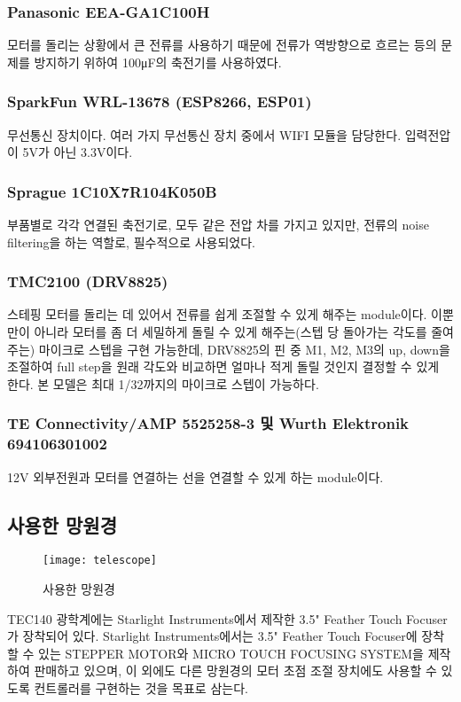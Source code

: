 \subsubsection{Panasonic EEA-GA1C100H}

모터를 돌리는 상황에서 큰 전류를 사용하기 때문에 전류가 역방향으로 흐르는 등의 문제를 방지하기 위하여 100μF의 축전기를 사용하였다.

\subsubsection{SparkFun WRL-13678 (ESP8266, ESP01)}

무선통신 장치이다. 여러 가지 무선통신 장치 중에서 WIFI 모듈을 담당한다. 입력전압이 5V가 아닌 3.3V이다.

\subsubsection{Sprague 1C10X7R104K050B}

부품별로 각각 연결된 축전기로, 모두 같은 전압 차를 가지고 있지만, 전류의 noise filtering을 하는 역할로, 필수적으로 사용되었다.

\subsubsection{TMC2100 (DRV8825)}

스테핑 모터를 돌리는 데 있어서 전류를 쉽게 조절할 수 있게 해주는 module이다. 이뿐만이 아니라 모터를 좀 더 세밀하게 돌릴 수 있게 해주는(스텝 당 돌아가는 각도를 줄여주는) 마이크로 스텝을 구현 가능한데, DRV8825의 핀 중 M1, M2, M3의 up, down을 조절하여 full step을 원래 각도와 비교하면 얼마나 적게 돌릴 것인지 결정할 수 있게 한다. 본 모델은 최대 1/32까지의 마이크로 스텝이 가능하다.

\subsubsection{TE Connectivity/AMP 5525258-3 및 Wurth Elektronik 694106301002}

12V 외부전원과 모터를 연결하는 선을 연결할 수 있게 하는 module이다.

\subsection{사용한 망원경}

\begin{wrapfigure}{l}{0.14\textwidth}
	\texttt{[image: telescope]}
	\caption{사용한 망원경}
	\label{fig:telescope}
\end{wrapfigure}
TEC140 광학계에는 Starlight Instruments에서 제작한 3.5" Feather Touch Focuser가 장착되어 있다. Starlight Instruments에서는 3.5" Feather Touch Focuser에 장착할 수 있는 STEPPER MOTOR와 MICRO TOUCH FOCUSING SYSTEM을 제작하여 판매하고 있으며, 이 외에도 다른 망원경의 모터 초점 조절 장치에도 사용할 수 있도록 컨트롤러를 구현하는 것을 목표로 삼는다.


